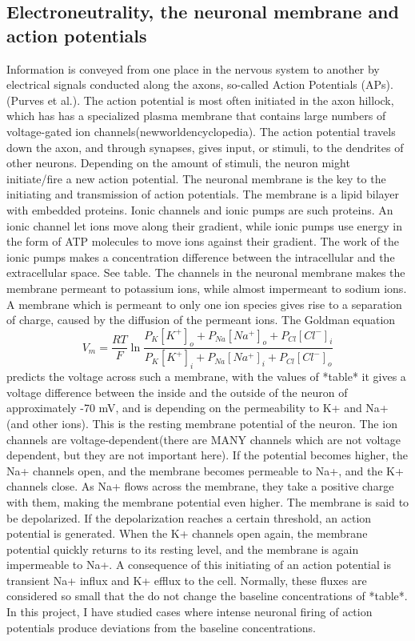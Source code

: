 \documentclass{article}
\begin{document}
\subsection{Electroneutrality, the neuronal membrane and action potentials}
Information is conveyed from one place in the nervous system to another by electrical signals conducted along the axons, so-called Action Potentials (APs). (Purves et al.). The action potential is most often initiated in the axon hillock, which has has a specialized plasma membrane that contains large numbers of voltage-gated ion channels(newworldencyclopedia). The action potential travels down the axon, and through synapses, gives input, or stimuli, to the dendrites of other neurons. Depending on the amount of stimuli, the neuron might initiate/fire a new action potential. 
The neuronal membrane is the key to the initiating and transmission of action potentials. The membrane is a lipid bilayer with embedded proteins. Ionic channels and ionic pumps are such proteins. An ionic channel let ions move along their gradient, while ionic pumps use energy in the form of ATP molecules to move ions against their gradient. The work of the ionic pumps makes a concentration difference between the intracellular and the extracellular space. See table. The  channels in the neuronal membrane makes the membrane permeant to potassium ions, while almost impermeant to sodium ions. A membrane which is permeant to only one ion species gives rise to a separation of charge, caused by the diffusion of the permeant ions. The Goldman equation 
\begin{equation}
V_m = \frac{RT}{F}\ln \frac{P_K[K^+]_o + P_{Na}[Na^+]_o + P_{Cl}[Cl^-]_{i}}{P_K[K^+]_i + P_{Na}[Na^+]_i + P_{Cl}[Cl^-]_{o}}
\end{equation}
predicts the voltage across such a membrane, with the values of *table* it gives a voltage difference between the inside and the outside of the neuron of approximately -70 mV, and is depending on the permeability to K+ and Na+ (and other ions). This is the resting membrane potential of the neuron. The ion channels are voltage-dependent(there are MANY channels which are not voltage dependent, but they are not important here). If the potential becomes higher, the Na+ channels open, and the membrane becomes permeable to Na+, and the K+ channels close. As Na+ flows across the membrane, they take a positive charge with them, making the membrane potential even higher. The membrane is said to be depolarized. If the depolarization reaches a certain threshold, an action potential is generated.  When the K+ channels open again, the membrane potential quickly returns to its resting level, and the membrane is again impermeable to Na+. A consequence of this initiating of an action potential is transient Na+ influx and K+ efflux to the cell. Normally, these fluxes are considered so small that the do not change the baseline concentrations of *table*. In this project, I have studied cases where intense neuronal firing of action potentials produce deviations from the baseline concentrations. 
\end{document}

